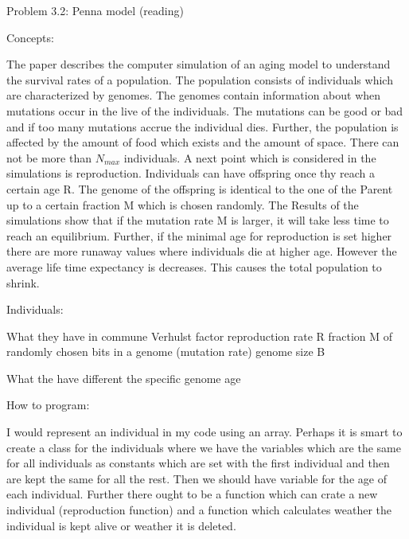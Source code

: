 Problem 3.2: Penna model (reading)

Concepts:

	The paper describes the computer simulation of an aging model to understand the survival rates of a population. The population consists of individuals which are characterized by genomes. The genomes contain information about when mutations occur in the live of the individuals. The mutations can be good or bad and if too many mutations accrue the individual dies.
	Further, the population is affected by the amount of food which exists and the amount of space. There can not be more than $N_{max}$ individuals.
	A next point which is considered in the simulations is reproduction. Individuals can have offspring once thy reach a certain age R. The genome of the offspring is identical to the one of the Parent up to a certain fraction M which is chosen randomly.
The Results of the simulations show that if the mutation rate M is larger, it will take less time to reach an equilibrium. Further, if the minimal age for reproduction is set higher there are more runaway values where individuals die at higher age. However the average life time expectancy is decreases. This causes the total population to shrink.


Individuals:

What they have in commune
	Verhulst factor
	reproduction rate R
	fraction M of randomly chosen bits in a genome (mutation rate)
	genome size B

What the have different
	the specific genome
	age

How to program:

I would represent an individual in my code using an array. Perhaps it is smart to create a class for the individuals where we have the variables which are the same for all individuals as constants which are set with the first individual and then are kept the same for all the rest. Then we should have variable for the age of each individual. Further there ought to be a function which can crate a new individual (reproduction function) and a function which calculates weather the individual is kept alive or weather it is deleted.


